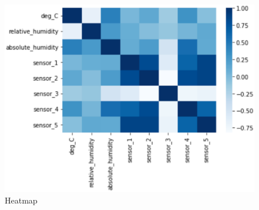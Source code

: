 \begin{figure}
  \centering
 \includegraphics[width=1.0\linewidth,height=0.8\linewidth]{graphics//Fig_heatmap.eps}
  \caption{Heatmap} \label{Heatmap}
\end{figure}


